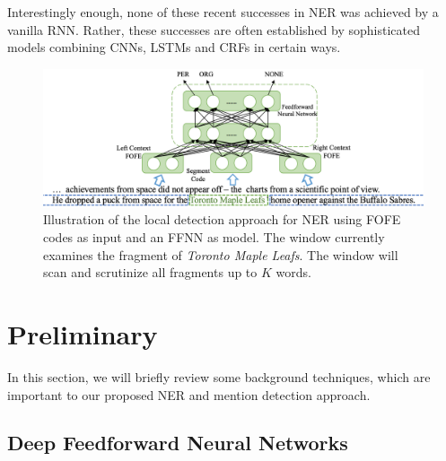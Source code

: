 \documentclass[11pt,a4paper]{article}
\begin{document}
Interestingly enough, none of these recent successes in NER was achieved by a vanilla RNN. Rather, 
these successes are often established by sophisticated models combining CNNs, LSTMs and CRFs in certain ways. 

\begin{figure}[t]
	\centering
	\includegraphics[width=0.86\linewidth]{figure-diagram-v4}
	\caption{Illustration of the local detection approach for NER using FOFE codes as input and an FFNN as model. The window currently examines the fragment of {\it Toronto Maple Leafs}. The window will scan and scrutinize all fragments up to $K$ words. }
	\label{Fig:FOFE-NER-diagram}
\end{figure}


\section{Preliminary}

In this section, we will briefly review some background techniques, which are important to our proposed NER and mention detection approach. 

\subsection{Deep Feedforward Neural Networks}
\end{document}
